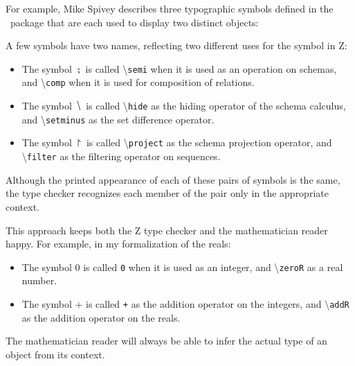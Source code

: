 \documentclass[11pt, oneside]{article}
\begin{document}
For example, Mike Spivey \cite{spivey-fm} describes three typographic symbols defined in the \fuzz\ package 
that are each used to display two distinct objects:
\begin{displayquote}
A few symbols have two names, reflecting two different uses for the
symbol in Z:
\begin{itemize}
\item The symbol $\semi$ is called 
\textbackslash\texttt{semi} when it is used as an operation on schemas, and 
\textbackslash\texttt{comp} when it is used for composition of relations.
\item The symbol $\hide$ is called
\textbackslash\texttt{hide} as the hiding operator of the schema calculus, and 
\textbackslash\texttt{setminus} as the set difference operator. 
\item The symbol $\project$ is called
\textbackslash\texttt{project} as the schema projection operator, and 
\textbackslash\texttt{filter} as the filtering operator on sequences.
\end{itemize}
Although the printed appearance of
each of these pairs of symbols is the same, the type checker
recognizes each member of the pair only in the appropriate
\hbox{context}.
\end{displayquote}
This approach keeps both the Z type checker and the mathematician reader happy.
For example, in my formalization of the reals:
\begin{itemize} 
\item The symbol $0$ is called \texttt{0} when it is used as an integer,
and \textbackslash\texttt{zeroR} as a real number.
\item The symbol $+$ is called 
\texttt{+} as the addition operator on the integers, and
\textbackslash\texttt{addR} as the addition operator on the reals.
\end{itemize}
The mathematician reader will always be able to infer the actual type of an object from its context.

\printbibliography
\end{document}
